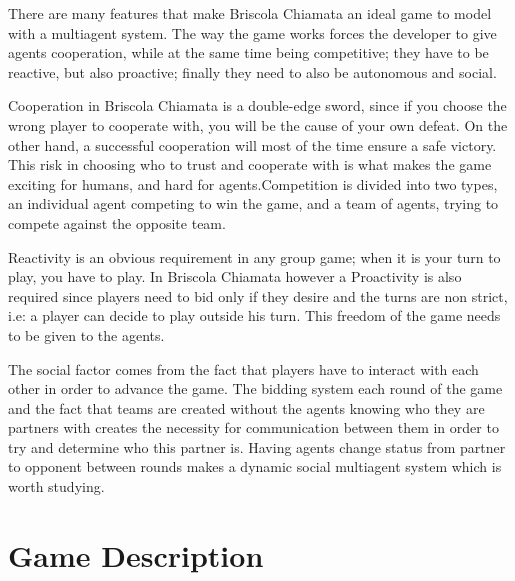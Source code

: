 \documentclass[a4paper]{article}
\begin{document}
There are many features that make Briscola Chiamata an ideal game to model with a multiagent system. The way the game works forces the developer to give agents cooperation, while at the same time being competitive; they have to be reactive, but also proactive; finally they need to also be autonomous and social.

Cooperation in Briscola Chiamata is a double-edge sword, since if you choose the wrong player to cooperate with, you will be the cause of your own defeat. On the other hand, a successful cooperation will most of the time ensure a safe victory. This risk in choosing who to trust and cooperate with is what makes the game exciting for humans, and hard for agents.Competition is divided into two types, an individual agent competing to win the game, and a team of agents, trying to compete against the opposite team.

Reactivity is an obvious requirement in any group game; when it is your turn to play, you have to play. In Briscola Chiamata however a Proactivity is also required since players need to bid only if they desire and the turns are non strict, i.e: a player can decide to play outside his turn. This freedom of the game needs to be given to the agents.

The social factor comes from the fact that players have to interact with each other in order to advance the game. The bidding system each round of the game and the fact that teams are created without the agents knowing who they are partners with creates the necessity for communication between them in order to try and determine who this partner is. Having agents change status from partner to opponent between rounds makes a dynamic social multiagent system which is worth studying.


\section{Game Description}
\end{document}
